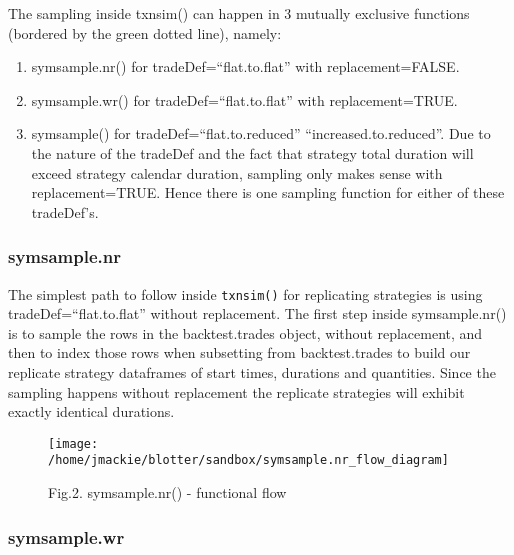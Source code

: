 The sampling inside txnsim() can happen in 3 mutually exclusive
functions (bordered by the green dotted line), namely:

\begin{enumerate}
\def\labelenumi{\arabic{enumi}.}
\tightlist
\item
  symsample.nr() for tradeDef=``flat.to.flat'' with replacement=FALSE.
\item
  symsample.wr() for tradeDef=``flat.to.flat'' with replacement=TRUE.
\item
  symsample() for tradeDef=``flat.to.reduced'' \textbar{}
  ``increased.to.reduced''. Due to the nature of the tradeDef and the
  fact that strategy total duration will exceed strategy calendar
  duration, sampling only makes sense with replacement=TRUE. Hence there
  is one sampling function for either of these tradeDef's.
\end{enumerate}

\hypertarget{symsample.nr}{%
\subsubsection{symsample.nr}\label{symsample.nr}}

The simplest path to follow inside \texttt{txnsim()} for replicating
strategies is using tradeDef=``flat.to.flat'' without replacement. The
first step inside symsample.nr() is to sample the rows in the
backtest.trades object, without replacement, and then to index those
rows when subsetting from backtest.trades to build our replicate
strategy dataframes of start times, durations and quantities. Since the
sampling happens without replacement the replicate strategies will
exhibit exactly identical durations.

\begin{Schunk}
\begin{figure}

{\centering \texttt{[image: /home/jmackie/blotter/sandbox/symsample.nr\_flow\_diagram]} 

}

\caption[Fig.2]{Fig.2. symsample.nr() - functional flow}\label{fig:symsample.nr flow diagram diagram}
\end{figure}
\end{Schunk}

\hypertarget{symsample.wr}{%
\subsubsection{symsample.wr}\label{symsample.wr}}

